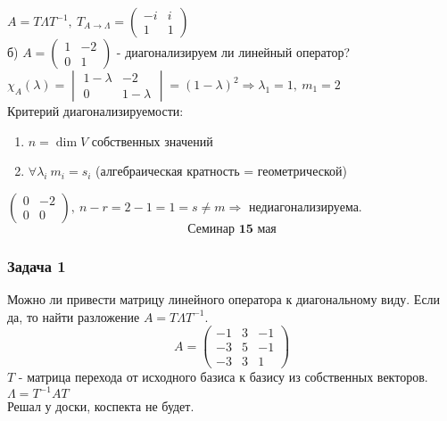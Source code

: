 \documentclass[12pt, letterpaper, twoside]{article}
\begin{document}
        $A = T\Lambda T^{-1},\ T_{A\rightarrow \Lambda} = \begin{pmatrix}
            -i & i\\
            1 & 1
        \end{pmatrix}$\\
        б) $A = \begin{pmatrix}
            1 & -2\\
            0 & 1
        \end{pmatrix}$ - диагонализируем ли линейный оператор?
        $\chi_A(\lambda) = \begin{vmatrix}
            1 - \lambda & -2\\
            0 & 1 - \lambda
        \end{vmatrix} = (1 - \lambda)^2\Rightarrow \lambda_1 = 1,\ m_1 = 2$\\
        Критерий диагонализируемости:\\
        \begin{enumerate}
            \item $n = \dim V$ собственных значений
            \item $\forall \lambda_i\ m_i = s_i$ (алгебраическая кратность = геометрической)
        \end{enumerate}
        $\begin{pmatrix}
            0 & -2\\
            0 & 0
        \end{pmatrix},\ n - r = 2 - 1 = 1 = s \neq m\Rightarrow$ недиагонализируема.
        \[\textbf{Семинар 15 мая}\]
        \subsubsection*{Задача 1}
        Можно ли привести матрицу линейного оператора к диагональному виду. Если да, то найти разложение $A = T\Lambda T^{-1}$.
        \[A = \begin{pmatrix}
            -1 & 3 & -1\\
            -3 & 5 & -1\\
            -3 & 3 & 1
        \end{pmatrix}\]
        $T$ - матрица перехода от исходного базиса к базису из собственных векторов.\\
        $\Lambda = T^{-1} A T$\\
        Решал у доски, коспекта не будет.
\end{document}
